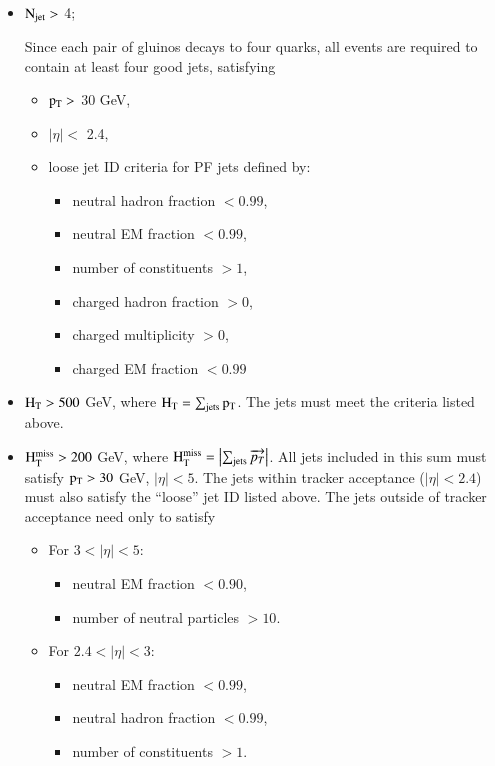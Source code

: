 \begin{itemize}

\item $\rm N_{jet} > $ 4;

Since each pair of gluinos decays to four quarks, all events are required to contain
at least four good jets, satisfying


\begin{itemize}

\item $\rm p_{T} > $  30 GeV,

\item $|\eta| < $ 2.4, 

\item  loose jet ID criteria for PF jets defined by: 

\begin{itemize}
    \item neutral hadron fraction $<0.99$,
    \item neutral EM fraction $<0.99$,
    \item number of constituents $>1$,
    \item charged hadron fraction $>0$,
    \item charged multiplicity $>0$,
    \item charged EM fraction $<0.99$
    \end{itemize}




\end{itemize}




\item $\rm H_{T} > 500 $ GeV, where $\rm H_{T} = \sum_{\mathrm{jets}} p_{T} $.
  The jets must meet the criteria listed above. 

\item $\rm H_{T}^{miss} > 200 $ GeV, where $\rm H_{T}^{miss} = \left|\sum_{\mathrm{jets}} \overrightarrow{{p}_T}\right|$.
  All jets included in this sum must satisfy $\rm p_{T} > 30$ GeV, $|\eta|
  < 5$. The jets within tracker acceptance ($|\eta| <2.4$) must also satisfy the ``loose''
  jet ID listed above.  The jets outside of tracker acceptance need only to satisfy

  \begin{itemize}
\item For $3<|\eta|<5$:
  \begin{itemize}
  \item neutral EM fraction $<0.90$,
  \item number of neutral particles $>10$.
  \end{itemize}
\item For $2.4<|\eta|<3$:
  \begin{itemize}
  \item neutral EM fraction $<0.99$,
  \item neutral hadron fraction $<0.99$,
  \item number of constituents $>1$.
  \end{itemize}
  \end{itemize}



\end{itemize}
